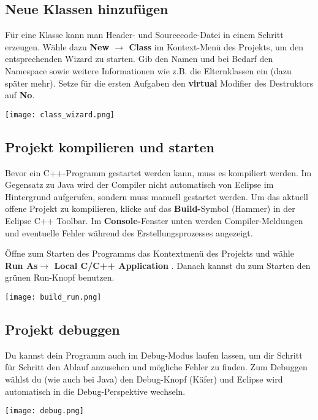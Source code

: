 \subsection{Neue Klassen hinzufügen}

Für eine Klasse kann man Header- und Sourcecode-Datei in einem Schritt erzeugen.
Wähle dazu \textbf{New $\rightarrow$ Class} im Kontext-Menü des Projekts, um den entsprechenden Wizard zu starten.
Gib den Namen und bei Bedarf den Namespace sowie weitere Informationen wie z.B. die Elternklassen ein (dazu später mehr).
Setze für die ersten Aufgaben den \textbf{virtual} Modifier des Destruktors auf \textbf{No}.

\begin{center}
	\texttt{[image: class\_wizard.png]}
\end{center}

\subsection{Projekt kompilieren und starten}

Bevor ein C++-Programm gestartet werden kann, muss es kompiliert werden.
Im Gegensatz zu Java wird der Compiler nicht automatisch von Eclipse im Hintergrund aufgerufen, sondern muss manuell gestartet werden.
Um das aktuell offene Projekt zu kompilieren, klicke auf das \textbf{Build-}Symbol (\glqq Hammer\grqq) in der Eclipse C++ Toolbar.
Im \textbf{Console-}Fenster unten werden Compiler-Meldungen und eventuelle Fehler während des Erstellungsprozesses angezeigt.

Öffne zum Starten des Programms das Kontextmenü des Projekts und wähle \textbf{Run As$\rightarrow$ Local C/C++ Application }.
Danach kannst du zum Starten den grünen Run-Knopf benutzen.

\begin{center}
\texttt{[image: build\_run.png]}
\end{center}

\subsection{Projekt debuggen}
Du kannst dein Programm auch im Debug-Modus laufen lassen, um dir Schritt für Schritt den Ablauf anzusehen und mögliche Fehler zu finden.
Zum Debuggen wählst du (wie auch bei Java) den Debug-Knopf (\glqq Käfer\grqq) und Eclipse wird automatisch in die Debug-Perspektive wechseln.

\texttt{[image: debug.png]}

